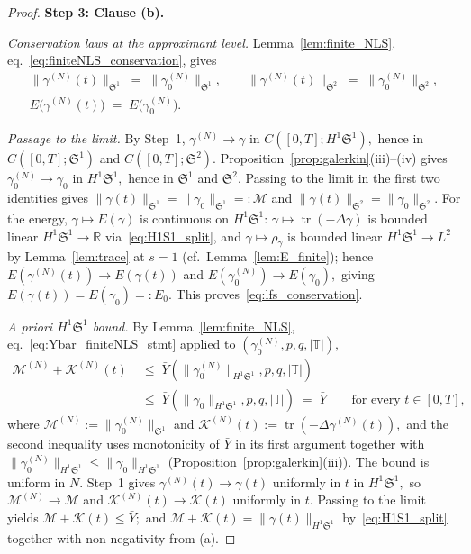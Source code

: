 \documentclass[11pt]{amsart}
\theoremstyle{definition}
\newcommand{\R}{\mathbb{R}}
\newcommand{\T}{\mathbb{T}}
\newcommand{\Sp}{\mathfrak{S}}
\DeclareMathOperator{\tr}{tr}
\begin{document}
\begin{proof}
\smallskip
\noindent\textbf{Step 3: Clause (b).}

\smallskip
\noindent\emph{Conservation laws at the approximant level.} Lemma~\ref{lem:finite_NLS}, eq.~\eqref{eq:finiteNLS_conservation}, gives
\begin{gather*}
  \|\gamma^{(N)}(t)\|_{\Sp^1}\;=\;\|\gamma_0^{(N)}\|_{\Sp^1},\qquad
  \|\gamma^{(N)}(t)\|_{\Sp^2}\;=\;\|\gamma_0^{(N)}\|_{\Sp^2},\\
  E\bigl(\gamma^{(N)}(t)\bigr)\;=\;E\bigl(\gamma_0^{(N)}\bigr).
\end{gather*}

\smallskip
\noindent\emph{Passage to the limit.} By Step~1, $\gamma^{(N)}\to\gamma$ in $C([0,T];H^1\Sp^1),$ hence in $C([0,T];\Sp^1)$ and $C([0,T];\Sp^2).$ Proposition~\ref{prop:galerkin}(iii)--(iv) gives $\gamma_0^{(N)}\to\gamma_0$ in $H^1\Sp^1,$ hence in $\Sp^1$ and $\Sp^2.$ Passing to the limit in the first two identities gives $\|\gamma(t)\|_{\Sp^1}=\|\gamma_0\|_{\Sp^1}=:\mathcal{M}$ and $\|\gamma(t)\|_{\Sp^2}=\|\gamma_0\|_{\Sp^2}.$ For the energy, $\gamma\mapsto E(\gamma)$ is continuous on $H^1\Sp^1$: $\gamma\mapsto\tr(-\Delta\gamma)$ is bounded linear $H^1\Sp^1\to\R$ via~\eqref{eq:H1S1_split}, and $\gamma\mapsto\rho_\gamma$ is bounded linear $H^1\Sp^1\to L^2$ by Lemma~\ref{lem:trace} at $s=1$ (cf.\ Lemma~\ref{lem:E_finite}); hence $E(\gamma^{(N)}(t))\to E(\gamma(t))$ and $E(\gamma_0^{(N)})\to E(\gamma_0),$ giving $E(\gamma(t))=E(\gamma_0)=:E_0.$ This proves~\eqref{eq:lfs_conservation}.

\smallskip
\noindent\emph{A priori $H^1\Sp^1$ bound.} By Lemma~\ref{lem:finite_NLS}, eq.~\eqref{eq:Ybar_finiteNLS_stmt} applied to $(\gamma_0^{(N)},p,q,|\T|),$
\[
\begin{aligned}
  \mathcal{M}^{(N)}+\mathcal{K}^{(N)}(t)
  &\;\le\;\bar Y(\|\gamma_0^{(N)}\|_{H^1\Sp^1},p,q,|\T|)\\
  &\;\le\;\bar Y(\|\gamma_0\|_{H^1\Sp^1},p,q,|\T|)\;=\;\bar Y
  \qquad\text{for every }t\in[0,T],
\end{aligned}
\]
where $\mathcal{M}^{(N)}:=\|\gamma_0^{(N)}\|_{\Sp^1}$ and $\mathcal{K}^{(N)}(t):=\tr(-\Delta\gamma^{(N)}(t)),$ and the second inequality uses monotonicity of $\bar Y$ in its first argument together with $\|\gamma_0^{(N)}\|_{H^1\Sp^1}\le\|\gamma_0\|_{H^1\Sp^1}$ (Proposition~\ref{prop:galerkin}(iii)). The bound is uniform in $N.$ Step~1 gives $\gamma^{(N)}(t)\to\gamma(t)$ uniformly in $t$ in $H^1\Sp^1,$ so $\mathcal{M}^{(N)}\to\mathcal{M}$ and $\mathcal{K}^{(N)}(t)\to\mathcal{K}(t)$ uniformly in $t.$ Passing to the limit yields $\mathcal{M}+\mathcal{K}(t)\le\bar Y;$ and $\mathcal{M}+\mathcal{K}(t)=\|\gamma(t)\|_{H^1\Sp^1}$ by~\eqref{eq:H1S1_split} together with non-negativity from (a).


\end{proof}
\end{document}
